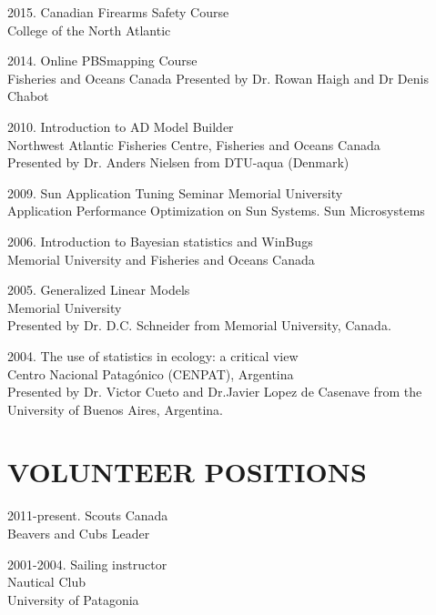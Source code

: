 \documentclass{res}
\begin{document}
\begin{resume}
\begin{hangparas}{.4in}{1}
2015. Canadian Firearms Safety Course\\
College of the North Atlantic

2014. Online PBSmapping  Course\\
Fisheries and Oceans Canada 
Presented by Dr. Rowan Haigh and Dr Denis Chabot

2010. Introduction to AD Model Builder\\
Northwest Atlantic Fisheries Centre, Fisheries and Oceans Canada \\
Presented by Dr. Anders Nielsen from DTU-aqua (Denmark)

2009. Sun Application Tuning Seminar
Memorial University\\
Application Performance Optimization on Sun Systems. Sun Microsystems

2006. Introduction to Bayesian statistics and WinBugs\\
Memorial University and Fisheries and Oceans Canada 

2005. Generalized Linear Models\\
Memorial University\\
Presented by Dr. D.C. Schneider from Memorial University, Canada.

2004. The use of statistics in ecology: a critical view  \\
Centro Nacional Patag\'{o}nico (CENPAT), Argentina\\
Presented by Dr. Victor Cueto and Dr.Javier Lopez de Casenave from the University of Buenos Aires, Argentina.

\end{hangparas}

\section{VOLUNTEER POSITIONS}
\vspace{0.2in}
\begin{hangparas}{.9in}{1}
2011-present. Scouts Canada	\\	
Beavers and Cubs Leader

2001-2004. Sailing instructor \\
Nautical Club\\
University of Patagonia
\end{hangparas}


\end{resume}
\end{document}
